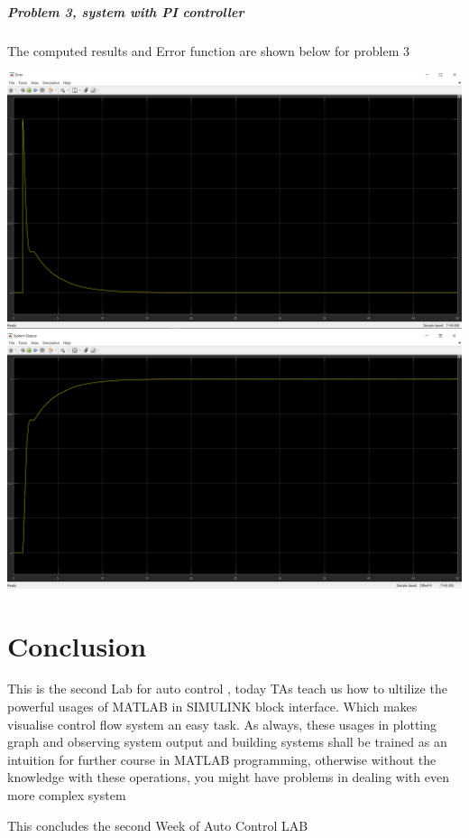 \documentclass[12pt]{article}
\begin{document}
\cleardoublepage
\subparagraph{Problem 3, system with PI controller}
\begin{center}
The computed results and Error function are shown below for problem 3\\
\end{center}

\includegraphics[scale=0.3]{../Lab3,4/HW for lab 3,4/LAB4/ERROR_3_PI_controller.png}\\ 
\includegraphics[scale=0.3]{../Lab3,4/HW for lab 3,4/LAB4/OUTPUT_3_PI_controller.png}\\ 
\cleardoublepage


\section{Conclusion}
This is the second Lab for auto control , today TAs teach us how to ultilize the powerful usages of MATLAB in SIMULINK block interface. Which makes visualise control flow system an easy task. As always, these usages in plotting graph and observing system output and building systems shall be trained as an intuition for further course in MATLAB programming, otherwise without the knowledge with these operations, you might have problems in dealing with even more complex system\\
\begin{center} 
This concludes the second Week of Auto Control LAB\\
\end{center}
\end{document}
